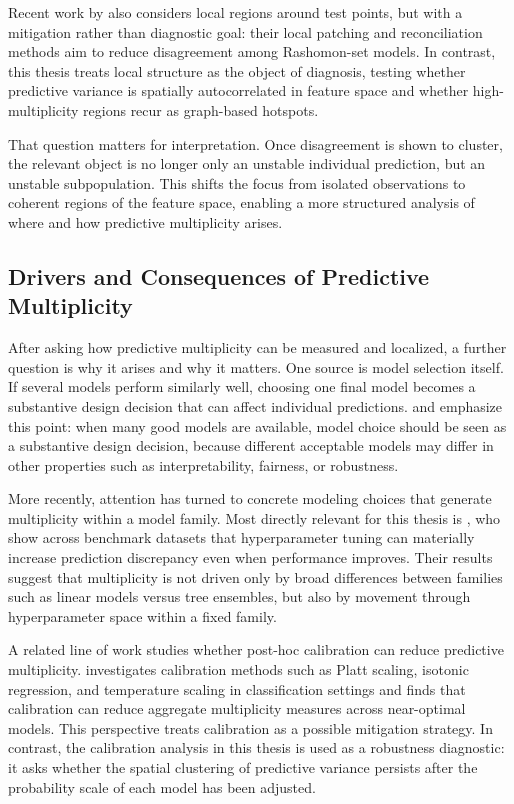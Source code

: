 Recent work by \citet{haghighat_resolving_2026} also considers local regions around
test points, but with a mitigation rather than diagnostic goal: their local patching and 
reconciliation methods aim to reduce disagreement among Rashomon-set models. In contrast, this
thesis treats local structure as the object of diagnosis, testing whether predictive variance is
spatially autocorrelated in feature space and whether high-multiplicity regions recur as graph-based
hotspots.

That question matters for interpretation. Once disagreement is shown to cluster, the
relevant object is no longer only an unstable individual prediction, but an unstable
subpopulation. This shifts the focus from isolated observations to coherent
regions of the feature space, enabling a more structured analysis of where and how
predictive multiplicity arises.


\subsection{Drivers and Consequences of Predictive Multiplicity}
\label{sec:drivers-review}

After asking how predictive multiplicity can be measured and localized, a further question
is why it arises and why it matters. One source is model selection itself. If several models
perform similarly well, choosing one final model becomes a substantive design decision that can
affect individual predictions. \cite{black_model_2022} and \cite{rudin_amazing_2024}
emphasize this point: when many good models are available, model choice should be seen
as a substantive design decision, because different acceptable models may differ in other
properties such as interpretability, fairness, or robustness.

More recently, attention has turned to concrete modeling choices that generate
multiplicity within a model family. Most directly relevant for this thesis is
\cite{cavus_role_2025}, who show across benchmark datasets that hyperparameter tuning
can materially increase prediction discrepancy even when performance improves.
Their results suggest that multiplicity is not driven only by broad differences between
families such as linear models versus tree ensembles, but also by movement through
hyperparameter space within a fixed family.

A related line of work studies whether post-hoc calibration can reduce predictive
multiplicity. \citet{cavus_mitigating_2026} investigates calibration methods such as
Platt scaling, isotonic regression, and temperature scaling in classification settings and
finds that calibration can reduce aggregate multiplicity measures across near-optimal
models. This perspective treats calibration as a possible mitigation strategy. In contrast,
the calibration analysis in this thesis is used as a robustness diagnostic: it asks whether
the spatial clustering of predictive variance persists after the probability scale of each
model has been adjusted.

